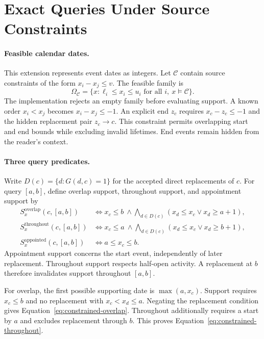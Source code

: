 \section{Exact Queries Under Source Constraints}
\label{app:constrained-dates}

\paragraph{Feasible calendar dates.}
This extension represents event dates as integers.
Let $\mathcal C$ contain source constraints of the form $x_i-x_j\le v$.
The feasible family is
\[
 \Omega_{\mathcal C}
 =\{x:\ell_i\le x_i\le u_i\text{ for all }i,\ x\models\mathcal C\}.
\]
The implementation rejects an empty family before evaluating support.
A known order $x_i<x_j$ becomes $x_i-x_j\le-1$.
An explicit end $z_c$ requires $x_c-z_c\le-1$ and the hidden replacement pair $z_c\to c$.
This constraint permits overlapping start and end bounds while excluding invalid lifetimes.
End events remain hidden from the reader's context.

\paragraph{Three query predicates.}
Write $D(c)=\{d:G(d,c)=1\}$ for the accepted direct replacements of $c$.
For query $[a,b]$, define overlap support, throughout support, and appointment support by
\begin{align}
 S^{\mathrm{overlap}}_x(c,[a,b])
 &\iff x_c\le b\ \land\!\bigwedge_{d\in D(c)}
 (x_d\le x_c\lor x_d\ge a+1),\label{eq:constrained-overlap}\\
 S^{\mathrm{throughout}}_x(c,[a,b])
 &\iff x_c\le a\ \land\!\bigwedge_{d\in D(c)}
 (x_d\le x_c\lor x_d\ge b+1),\label{eq:constrained-throughout}\\
 S^{\mathrm{appointed}}_x(c,[a,b])
 &\iff a\le x_c\le b.\label{eq:constrained-appointed}
\end{align}
Appointment support concerns the start event, independently of later replacement.
Throughout support respects half-open activity.
A replacement at $b$ therefore invalidates support throughout $[a,b]$.

For overlap, the first possible supporting date is $\max(a,x_c)$.
Support requires $x_c\le b$ and no replacement with $x_c<x_d\le a$.
Negating the replacement condition gives Equation~\eqref{eq:constrained-overlap}.
Throughout additionally requires a start by $a$ and excludes replacement through $b$.
This proves Equation~\eqref{eq:constrained-throughout}.

